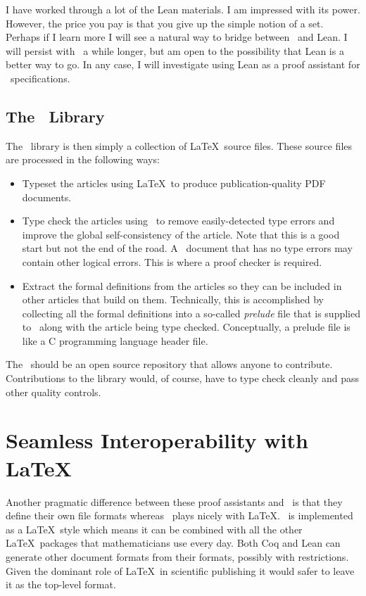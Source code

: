 \documentclass{amsart}
\begin{document}
I have worked through a lot of the Lean materials.
I am impressed with its power.
However, the price you pay is that you give up the simple notion of a set.
Perhaps if I learn more I will see a natural way to bridge between \ZN\ and Lean.
I will persist with \ZN\ a while longer, but am open to the possibility that Lean is a better way to go.
In any case, I will investigate using Lean as a proof assistant for \ZN\ specifications.

\subsection{The \mathz\ Library}

The \mathz\ library is then simply a collection of \LaTeX\ source files.
These source files are processed in the following ways:
\begin{itemize}
\item Typeset the articles using \LaTeX\ to produce publication-quality PDF documents.
\item Type check the articles using \fuzz\ to remove easily-detected type errors and improve the global self-consistency of the article.
Note that this is a good start but not the end of the road. 
A \ZN\ document that has no type errors may contain other logical errors.
This is where a proof checker is required.
\item Extract the formal definitions from the articles so they can be included in other articles that build on them.
Technically, this is accomplished by collecting all the formal definitions into a so-called \emph{prelude} file that
is supplied to \fuzz\ along with the article being type checked.
Conceptually, a prelude file is like a C programming language header file.
\end{itemize}

The \mathz\ should be an open source repository that allows anyone to contribute.
Contributions to the library would, of course, have to type check cleanly and pass other quality controls.

\hypertarget{seamless-interoperability-with-latex}{}
\section{Seamless Interoperability with \LaTeX}

Another pragmatic difference between these proof assistants and \ZN\ is that they define their own file formats whereas
\ZN\ plays nicely with \LaTeX. 
\ZN\ is implemented as a \LaTeX\ style which means it can be combined with all the other \LaTeX\
packages that mathematicians use every day.
Both Coq and Lean can generate other document formats from their formats, possibly with restrictions.
Given the dominant role of \LaTeX\ in scientific publishing it would safer to leave it as the top-level format.
\end{document}
